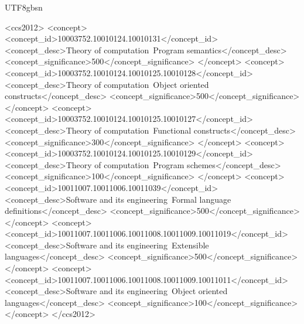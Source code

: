 \begin{CJK*}{UTF8}{gbsn}
\begin{CCSXML}
<ccs2012>
<concept>
<concept_id>10003752.10010124.10010131</concept_id>
<concept_desc>Theory of computation~Program semantics</concept_desc>
<concept_significance>500</concept_significance>
</concept>
<concept>
<concept_id>10003752.10010124.10010125.10010128</concept_id>
<concept_desc>Theory of computation~Object oriented constructs</concept_desc>
<concept_significance>500</concept_significance>
</concept>
<concept>
<concept_id>10003752.10010124.10010125.10010127</concept_id>
<concept_desc>Theory of computation~Functional constructs</concept_desc>
<concept_significance>300</concept_significance>
</concept>
<concept>
<concept_id>10003752.10010124.10010125.10010129</concept_id>
<concept_desc>Theory of computation~Program schemes</concept_desc>
<concept_significance>100</concept_significance>
</concept>
<concept>
<concept_id>10011007.10011006.10011039</concept_id>
<concept_desc>Software and its engineering~Formal language definitions</concept_desc>
<concept_significance>500</concept_significance>
</concept>
<concept>
<concept_id>10011007.10011006.10011008.10011009.10011019</concept_id>
<concept_desc>Software and its engineering~Extensible languages</concept_desc>
<concept_significance>500</concept_significance>
</concept>
<concept>
<concept_id>10011007.10011006.10011008.10011009.10011011</concept_id>
<concept_desc>Software and its engineering~Object oriented languages</concept_desc>
<concept_significance>100</concept_significance>
</concept>
</ccs2012>
\end{CCSXML}

\begin{abstract}


\end{abstract}
\end{CJK*}
